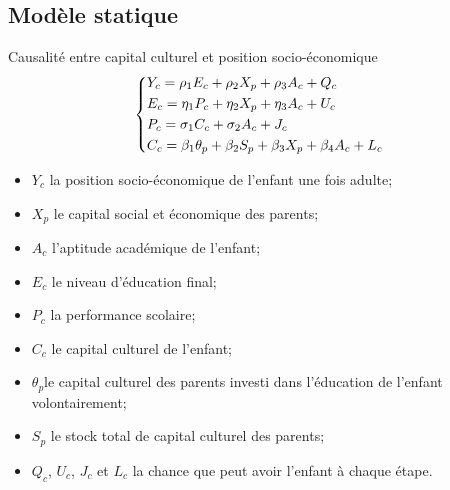 \documentclass[9pt]{beamer}
\begin{document}
\subsection{Modèle statique}
\begin{frame}
	\begin{block}{Causalité entre capital culturel et position socio-économique}
		\begin{align}		
			\begin{dcases}
			Y_c=\rho_1E_c+\rho_2X_p+\rho_3A_c+Q_c\\
			E_c=\eta_1P_c + \eta_2X_p + \eta_3A_c+U_c \\
			P_c=\sigma_1C_c + \sigma_2A_c + J_c\\
			C_c=\beta_1\theta_p + \beta_2S_p + \beta_3X_p + \beta_4A_c + L_c
			\end{dcases}
		\end{align}
		\begin{itemize}
		\item $Y_c$ la position socio-économique de l'enfant une fois adulte;
		\item $X_p$ le capital social et économique des parents;
 		\item $A_c$ l'aptitude académique de l'enfant;
 		\item $E_c$ le niveau d'éducation final;
 		\item $P_c$ la performance scolaire;
 		\item $C_c$ le capital culturel de l'enfant;
 		\item $\theta_p$le capital culturel des parents investi dans l'éducation de l'enfant volontairement;
 		\item $S_p$ le stock total de capital culturel des parents;
 		\item $Q_c$, $U_c$, $J_c$ et $L_c$ la chance que peut avoir l'enfant à chaque étape.
		\end{itemize}
	\end{block}
\end{frame}
\end{document}

